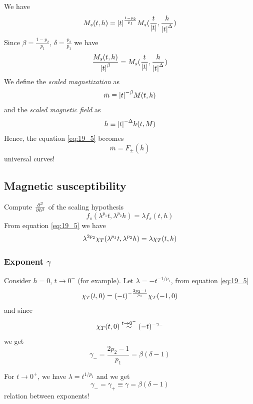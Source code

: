 \documentclass[../main/main.tex]{subfiles}
\begin{document}
We have
\begin{equation}
  M_s (t,h) = \abs{t}^{\frac{1-p_2}{p_1}} M_s ( \frac{t}{\abs{t} }, \frac{h}{\abs{t}^{\Delta } })
\end{equation}
Since \( \beta = \frac{1-p_2}{p_1} \), \( \delta = \frac{p_2}{p_1} \) we have
\begin{equation}
  \frac{M_s (t,h)}{\abs{t}^{\beta } } = M_s ( \frac{t}{\abs{t} }, \frac{h}{\abs{t}^{\Delta } })
  \label{eq:19_5}
\end{equation}
We define the \emph{scaled magnetization} as
\begin{equation}
  \bar{m} \equiv \abs{t}^{-\beta } M(t,h)
\end{equation}
and the \emph{scaled magnetic field} as
\begin{equation}
  \bar{h} \equiv \abs{t}^{-\Delta } h (t,M)
\end{equation}
Hence, the equation \eqref{eq:19_5} becomes
\begin{equation}
  \bar{m} = F_{\pm} (\bar{h} )
\end{equation}
universal curves!

\subsection{Magnetic susceptibility}
Compute \( \pdv[2]{}{h}  \) of the scaling hypothesis
\begin{equation}
  f_s ( \lambda^{p_1} t, \lambda ^{p_2}h) = \lambda f_s (t,h)
\end{equation}
From equation \eqref{eq:19_5} we have
\begin{equation}
  \lambda ^{2p_2} \chi _T \qty(\lambda ^{p_1}t, \lambda ^{p_2}h) = \lambda \chi _T (t,h)
\end{equation}
\subsubsection{Exponent \( \gamma   \) }
Consider \( h=0 \), \( t \rightarrow 0^- \) (for example).
 Let \( \lambda = - t ^{-1/p_1} \), from equation \eqref{eq:19_5}
\begin{equation}
  \chi _T (t,0) = \qty(-t)^{-\frac{2p_2-1}{p_1}} \chi _T (-1,0)
\end{equation}
and since
\begin{equation}
  \chi _T (t,0) \overset{t \rightarrow 0^-}{\sim } \qty(-t)^{-\gamma_-  }
\end{equation}
we get
\begin{equation}
  \gamma _- = \frac{2p_2 -1}{p_1} = \beta (\delta -1)
\end{equation}
\begin{remark}
For \( t \rightarrow 0^+ \), we have \( \lambda  = t ^{1/p_1} \) and we get
\begin{equation}
  \gamma _- = \gamma _+ \equiv \gamma  = \beta (\delta -1)
\end{equation}
relation between exponents!
\end{remark}
\end{document}
